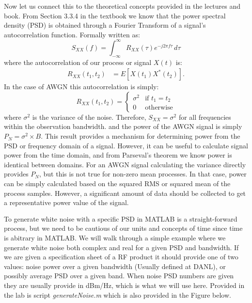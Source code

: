 \documentclass[letterpaper,12pt]{article}
\begin{document}
%
Now let us connect this to the theoretical concepts provided in the lectures and book. From Section 3.3.4 in the textbook we know that the power spectral density (PSD) is obtained through a Fourier Transform of a signal's autocorrelation function. Formally written as:
%
\begin{equation}
S_{XX}(f) = \int_{-\infty}^{\infty} \! R_{XX}(\tau)e^{-j2{\pi}f\tau}
\, d\tau
\end{equation}
%
where the autocorrelation of our process or signal $X(t)$ is:
%
\begin{equation}
\begin{split}
    R_{XX}(t_1,t_2)&=E[X(t_1)X^{\ast}(t_2)].
\end{split}
\end{equation}
%
In the case of AWGN this autocorrelation is simply:
%
\begin{equation}
  R_{XX}(t_1,t_2) =
  \begin{cases}
    \sigma^2 & \text{if $t_1=t_2$} \\
    0        & \text{otherwise}
  \end{cases}
\end{equation}
%
where $\sigma^2$ is the variance of the noise.  Therefore, $S_{XX}=\sigma^2$ for all frequencies within the observation bandwidth. and the power of the AWGN signal is simply $P_N = \sigma^2\times B$. This result provides a mechanism for determining power from the PSD or frequency domain of a signal.  However, it can be useful to calculate signal power from the time domain, and from Parseval's theorem we know power is identical between domains.  For an AWGN signal calculating the variance directly provides $P_N$, but this is not true for non-zero mean processes.  In that case, power can be simply calculated based on the squared RMS or squared mean of the process samples. However, a significant amount of data should be collected to get a representative power value of the signal.\par
%
To generate white noise with a specific PSD in MATLAB is a straight-forward process, but we need to be cautious of our units and concepts of time since time is abitrary in MATLAB. We will walk through a simple example where we generate white noise both complex and real for a given PSD and bandwidth. If we are given a specification sheet of a RF product it should provide one of two values: noise power over a given bandwidth (Usually defined at DANL), or possibly average PSD over a given band.  When noise PSD numbers are given they are usually provide in dBm/Hz, which is what we will use here.  Provided in the lab is script \textit{generateNoise.m} which is also provided in the Figure below.\par
\end{document}
